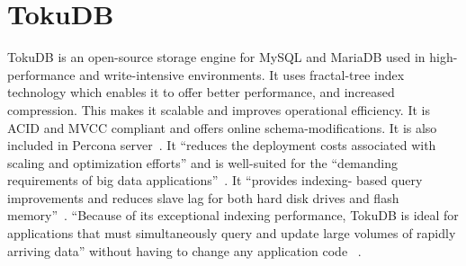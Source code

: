 \section{TokuDB}
 
TokuDB is an open-source storage engine for MySQL and MariaDB used in high-
performance and write-intensive environments. It uses fractal-tree index 
technology which enables it to offer better performance, and increased compression. 
This makes it scalable and improves operational efficiency. It is ACID and MVCC 
compliant and offers online schema-modifications. It is also included in Percona 
server~\cite{hid-sp18-516-wiki-tokudb}. It ``reduces the deployment costs associated with 
scaling and optimization efforts'' and is well-suited for the ``demanding requirements 
of big data applications''~\cite{hid-sp18-516-percona-tokudb}. It ``provides indexing-
based query improvements and reduces slave lag for both hard disk drives and flash 
memory''~\cite{hid-sp18-516-wiki-tokudb}. ``Because of its exceptional indexing performance, 
TokuDB is ideal for applications that must simultaneously query and update large 
volumes of rapidly arriving data'' without having to change any application code
~\cite{hid-sp18-516-blackbird-si}.

